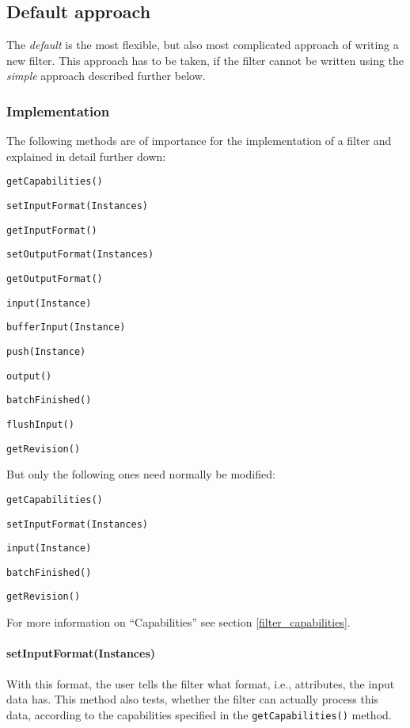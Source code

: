 \subsection{Default approach}
The \textit{default} is the most flexible, but also most complicated approach
of writing a new filter. This approach has to be taken, if the filter cannot be
written using the \textit{simple} approach described further below.

\subsubsection{Implementation}
The following methods are of importance for the implementation of a filter and
explained in detail further down:
\begin{tight_itemize}
  \item \texttt{getCapabilities()}
  \item \texttt{setInputFormat(Instances)}
  \item \texttt{getInputFormat()}
  \item \texttt{setOutputFormat(Instances)}
  \item \texttt{getOutputFormat()}
  \item \texttt{input(Instance)}
  \item \texttt{bufferInput(Instance)}
  \item \texttt{push(Instance)}
  \item \texttt{output()}
  \item \texttt{batchFinished()}
  \item \texttt{flushInput()}
  \item \texttt{getRevision()}
\end{tight_itemize}
But only the following ones need normally be modified:
\begin{tight_itemize}
  \item \texttt{getCapabilities()}
  \item \texttt{setInputFormat(Instances)}
  \item \texttt{input(Instance)}
  \item \texttt{batchFinished()}
  \item \texttt{getRevision()}
\end{tight_itemize}
For more information on ``Capabilities'' see section \ref{filter_capabilities}.

\newpage
\paragraph{setInputFormat(Instances)}
With this format, the user tells the filter what format, i.e., attributes, the
input data has. This method also tests, whether the filter can actually process
this data, according to the capabilities specified in the
\texttt{getCapabilities()} method.

